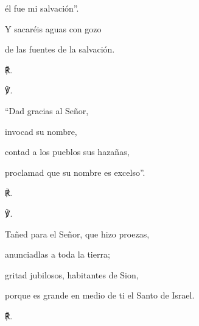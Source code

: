 			\begin{readtabbed}él fue mi salvación”.\end{readtabbed}
			
			\begin{readtabbed}Y sacaréis aguas con gozo\end{readtabbed}
			
			\begin{readtabbed}de las fuentes de la salvación. \begin{readred}℟.\end{readred}\end{readtabbed}
			
			\begin{readbody}\begin{readred}℣.\end{readred} “Dad gracias al Señor,\end{readbody}
			
			\begin{readtabbed}invocad su nombre,\end{readtabbed}
			
			\begin{readtabbed}contad a los pueblos sus hazañas,\end{readtabbed}
			
			\begin{readtabbed}proclamad que su nombre es excelso”. \begin{readred}℟.\end{readred}\end{readtabbed}
			
			\begin{readbody}\begin{readred}℣.\end{readred} Tañed para el Señor, que hizo proezas,\end{readbody}
			
			\begin{readtabbed}anunciadlas a toda la tierra;\end{readtabbed}
			
			\begin{readtabbed}gritad jubilosos, habitantes de Sion,\end{readtabbed}
			
			\begin{readtabbed}porque es grande en medio de ti el Santo de Israel. \begin{readred}℟.\end{readred}\end{readtabbed}
			
